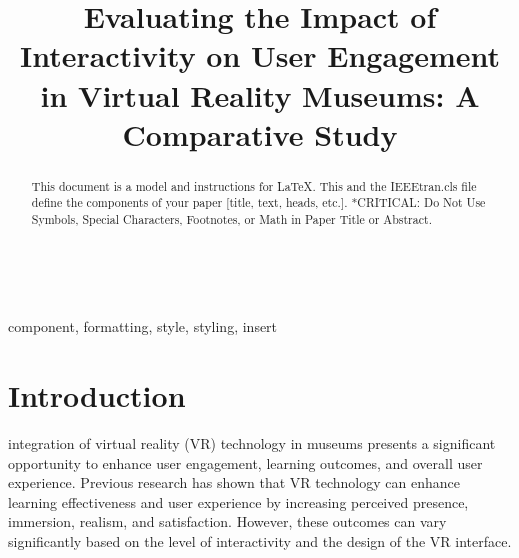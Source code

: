 \documentclass[conference]{IEEEtran}
\begin{document}
\title{Evaluating the Impact of Interactivity on User Engagement in Virtual Reality Museums: A Comparative Study}\\

\author{
\and
{}
\and
{}
\and
{}
}

\maketitle

\begin{abstract}
This document is a model and instructions for \LaTeX.
This and the IEEEtran.cls file define the components of your paper [title, text, heads, etc.]. *CRITICAL: Do Not Use Symbols, Special Characters, Footnotes, 
or Math in Paper Title or Abstract.
\end{abstract}

\begin{IEEEkeywords}
component, formatting, style, styling, insert
\end{IEEEkeywords}

\section{Introduction}
 integration of virtual reality (VR) technology in museums presents a significant opportunity to enhance user engagement, learning outcomes, and overall user experience. Previous research has shown that VR technology can enhance learning effectiveness and user experience by increasing perceived presence, immersion, realism, and satisfaction​. However, these outcomes can vary significantly based on the level of interactivity and the design of the VR interface.
\end{document}
